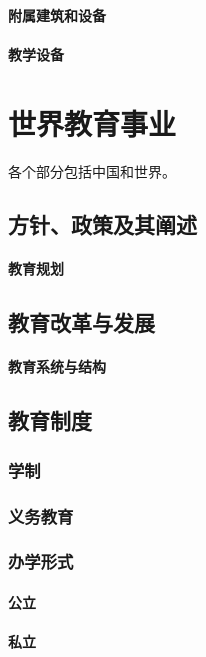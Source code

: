 \documentclass[UTF8]{../../ApplicationUniverse}
\begin{document}
    \subsubsection{附属建筑和设备}
    \subsubsection{教学设备}




\chapter{世界教育事业}

各个部分包括中国和世界。

\section{方针、政策及其阐述}
    \subsubsection{教育规划}
\section{教育改革与发展}
    \subsubsection{教育系统与结构}
\section{教育制度}
    \subsection{学制}
    \subsection{义务教育}
    \subsection{办学形式}
        \subsubsection{公立}
        \subsubsection{私立}
\end{document}
